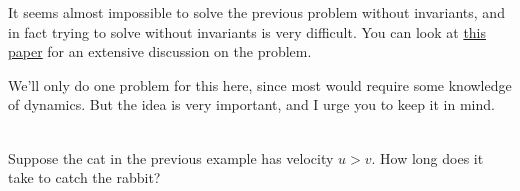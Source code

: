 It seems almost impossible to solve the previous problem without invariants, and in fact trying to solve without invariants 
is very difficult. You can look at \href{https://arxiv.org/pdf/1108.2006}{this paper} for an extensive discussion on 
the problem. 

We'll only do one problem for this here, since most would require some knowledge of dynamics. But the 
idea is very important, and I urge you to keep it in mind. 


\begin{exc}
    \begin{exercise}[subtitle={Chasing Problem}, points = 2]
        \smallskip
        ~\\
        Suppose the cat in the previous example has velocity $u > v$. How long does it take to catch the rabbit?
    \end{exercise}
    \end{exc}